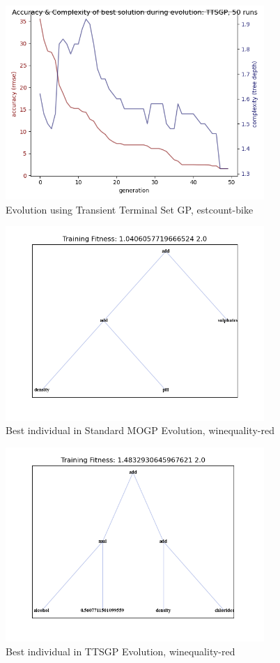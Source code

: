 \documentclass[a4paper]{article}
\begin{document}
\begin{figure}[H]
	\caption{Evolution using Transient Terminal Set GP, estcount-bike}
	\centering
	\includegraphics[width=0.875\textwidth]{estcount-bike-evo-TTSGP}
\end{figure}

\begin{figure}[H]
	\caption{Best individual in Standard MOGP Evolution, winequality-red}
	\centering
	\includegraphics[width=0.875\textwidth]{winequality-red-MOGP-ex}
\end{figure}
\begin{figure}[H]
	\caption{Best individual in TTSGP Evolution, winequality-red}
	\centering
	\includegraphics[width=0.875\textwidth]{winequality-red-TTSGP-ex}
\end{figure}
\end{document}
